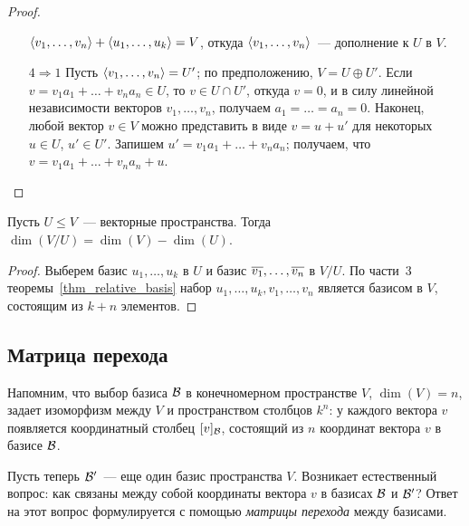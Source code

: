 \begin{proof}
\begin{itemize}
  $\langle v_1,\dots,v_n\rangle + \langle u_1,\dots,u_k\rangle = V$, откуда
  $\langle v_1,\dots,v_n\rangle$~--- дополнение к $U$ в $V$.
\item[$4\Rightarrow 1$] Пусть $\langle v_1,\dots,v_n\rangle=U'$; по
  предположению, $V=U\oplus U'$. Если $v = v_1a_1 + \dots +
  v_na_n\in U$, то $v\in U\cap U'$, откуда $v=0$, и в силу
  линейной независимости векторов $v_1,\dots,v_n$, получаем $a_1 = \dots =
  a_n = 0$.
  Наконец, любой вектор $v\in V$ можно представить в виде $v=u+u'$ для
  некоторых $u\in U$, $u'\in U'$. Запишем $u' = v_1a_1 + \dots +
  v_na_n$; получаем, что $v = v_1a_1 + \dots +
  v_na_n + u$.
\end{itemize}
\end{proof}

\begin{corollary}
Пусть $U\leq V$~--- векторные пространства. Тогда
$\dim(V/U)=\dim(V)-\dim(U)$.
\end{corollary}
\begin{proof}
Выберем базис $u_1,\dots,u_k$ в $U$ и базис $\overline{v_1},\dots,\overline{v_n}$
в $V/U$. По части~3 теоремы~\ref{thm_relative_basis} набор
$u_1,\dots,u_k,v_1,\dots,v_n$ является базисом в $V$, состоящим из
$k+n$ элементов.
\end{proof}


\subsection{Матрица перехода}


Напомним, что выбор базиса $\mathcal B$ в конечномерном пространстве $V$,
$\dim(V)=n$, задает
изоморфизм между $V$ и пространством столбцов $k^n$: у каждого
вектора $v$ появляется координатный столбец $[v]_{\mathcal B}$, состоящий
из $n$ координат вектора $v$ в базисе $\mathcal B$.

Пусть теперь $\mathcal B'$~--- еще один базис пространства $V$. Возникает
естественный вопрос: как связаны между собой координаты вектора $v$ в
базисах $\mathcal B$ и $\mathcal B'$? Ответ на этот вопрос формулируется с
помощью {\em матрицы перехода} между базисами.

